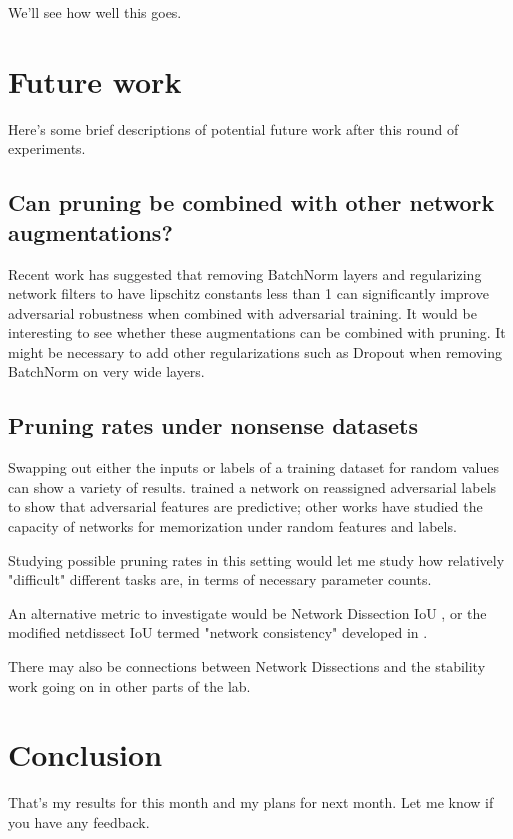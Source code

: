 \documentclass[11pt]{article}
\begin{document}
We'll see how well this goes.


\section{Future work}
\label{sec:orgc971220}
Here's some brief descriptions of potential future work after this round of experiments.

\subsection{Can pruning be combined with other network augmentations?}
\label{sec:org696201c}
Recent work has suggested that removing BatchNorm layers \citep{BatchNormBad} and regularizing network filters to have lipschitz constants less than 1 \citep{ParsevalNetworks} can significantly improve adversarial robustness when combined with adversarial training. It would be interesting
to see whether these augmentations can be combined with pruning. It might be necessary to add other regularizations such as Dropout when removing
BatchNorm on very wide layers.

\subsection{Pruning rates under nonsense datasets}
\label{sec:orgb75c7a5}
Swapping out either the inputs or labels of a training dataset for random values can show a variety of results. \citep{NotBugsFeatures} trained a network on reassigned adversarial labels to show that adversarial features are predictive; other works
have studied the capacity of networks for memorization under random features and labels.

Studying possible pruning rates in this setting would let me study how relatively "difficult" different tasks are, in terms of necessary parameter counts.

An alternative metric to investigate would be Network Dissection IoU \citep{netdissect2017}, or the modified netdissect IoU termed "network consistency" developed in \citep{AdvTowardsInterpretability}.

There may also be connections between Network Dissections and the stability work going on in other parts of the lab.

\section{Conclusion}
\label{sec:orgfb25c79}
That's my results for this month and my plans for next month. Let me know if you have any feedback.



\end{document}
